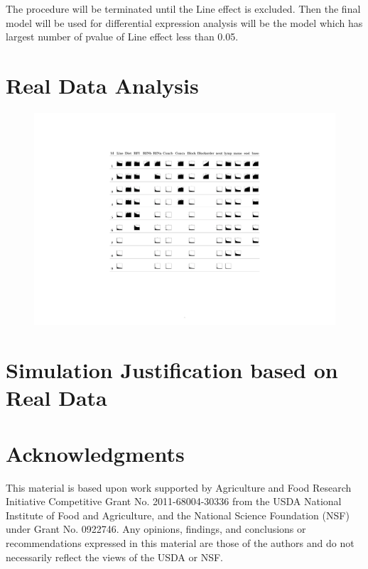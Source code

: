\documentclass[11pt]{article}
\begin{document}
The procedure will be terminated until the Line effect is excluded.  Then the final model will be used for differential expression analysis will be the model which has largest number of pvalue of Line effect less than 0.05.
\section{Real Data Analysis}

\begin{figure}
\centering
\includegraphics[scale = 0.2]{PlotG9P2PairedEndCBCpvalue05.pdf}
\end{figure}

\section{Simulation Justification based on Real Data}

\section*{Acknowledgments}
This material is based upon work supported by Agriculture and Food
Research Initiative Competitive Grant No. 2011-68004-30336 from
the USDA National Institute of Food and Agriculture, and the
National Science Foundation (NSF) under Grant No. 0922746.
Any opinions, findings, and conclusions or recommendations expressed
in this material are those of the authors and do not necessarily reflect
the views of the USDA or NSF.


\begin{bibliography}{99}
\end{bibliography}
\end{document}

